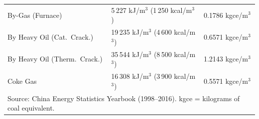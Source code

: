 \documentclass[11pt,a4paper]{article}
\begin{document}
\begin{table}[htbp]
\begin{tabular}{lll}
By-Gas (Furnace)            & 5\,227 kJ/m$^3$ (1\,250 kcal/m$^3$) & 0.1786 kgce/m$^3$ \\
By Heavy Oil (Cat.\ Crack.) & 19\,235 kJ/m$^3$ (4\,600 kcal/m$^3$) & 0.6571 kgce/m$^3$ \\
By Heavy Oil (Therm.\ Crack.)& 35\,544 kJ/m$^3$ (8\,500 kcal/m$^3$) & 1.2143 kgce/m$^3$ \\
Coke Gas                    & 16\,308 kJ/m$^3$ (3\,900 kcal/m$^3$) & 0.5571 kgce/m$^3$ \\
\bottomrule
\multicolumn{3}{p{0.9\textwidth}}{\footnotesize Source: China Energy Statistics Yearbook (1998--2016). kgce = kilograms of coal equivalent.}
\end{tabular}
\end{table}
\end{document}
